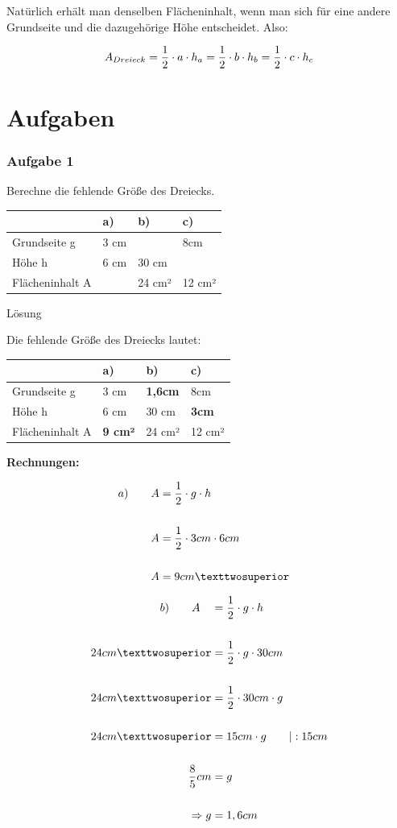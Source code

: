 \documentclass[
  ngerman,
]{book}
\begin{document}
Natürlich erhält man denselben Flächeninhalt, wenn man sich für eine andere Grundseite und die dazugehörige Höhe entscheidet. Also:

\[A_{Dreieck} = {1 \over 2} \cdot a \cdot h_{a} = {1 \over 2} \cdot b \cdot h_{b} = {1 \over 2} \cdot c \cdot h_{c}\]

\hypertarget{aufgaben-1}{%
\section*{Aufgaben}\label{aufgaben-1}}

\hypertarget{aufgabe-1-1}{%
\subsubsection*{Aufgabe 1}\label{aufgabe-1-1}}

Berechne die fehlende Größe des Dreiecks.

\begin{longtable}[]{@{}llll@{}}
\toprule
& a) & b) & c)\tabularnewline
\midrule
\endhead
Grundseite g & 3 cm & & 8cm\tabularnewline
Höhe h & 6 cm & 30 cm &\tabularnewline
Flächeninhalt A & & 24 cm² & 12 cm²\tabularnewline
\bottomrule
\end{longtable}

Lösung

Die fehlende Größe des Dreiecks lautet:

\begin{longtable}[]{@{}llll@{}}
\toprule
& a) & b) & c)\tabularnewline
\midrule
\endhead
Grundseite g & 3 cm & \textbf{1,6cm} & 8cm\tabularnewline
Höhe h & 6 cm & 30 cm & \textbf{3cm}\tabularnewline
Flächeninhalt A & \textbf{9 cm²} & 24 cm² & 12 cm²\tabularnewline
\bottomrule
\end{longtable}

\textbf{Rechnungen:}

\[\begin{align} a) \quad\quad A &= {1 \over 2} \cdot g \cdot h \\
{}\\
A &= {1 \over 2} \cdot 3 cm \cdot 6 cm \\
{}\\
A&= 9 cm² \quad \end{align}\]

\[\begin{align} b) \quad\quad A\quad &= {1 \over 2} \cdot g \cdot h \\
{}\\
24 cm² &= {1 \over 2} \cdot g \cdot 30cm \\
{}\\
24 cm² &= {1 \over 2} \cdot 30cm \cdot g \\
{}\\
24 cm² &= 15cm \cdot g  \quad\quad | : 15 cm\\
{}\\
{8 \over 5} cm &= g\\
{}\\
\Rightarrow g &= 1,6 cm \end{align}\]
\end{document}
